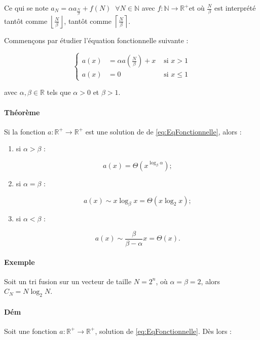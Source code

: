 \documentclass{article}
\newcommand{\floor}[1]{{\left\lfloor#1\right\rfloor}}
\newcommand{\ceil}[1]{{\left\lceil#1\right\rceil}}
\begin{document}
			Ce qui se note $a_N = \alpha a_{\frac N\beta} + f(N)\;\;\forall N \in \mathbb N$ avec $f : \mathbb N \to \mathbb R^+$et où $\frac N\beta$ est interprété
			tantôt comme $\floor{\frac N\beta}$, tantôt comme $\ceil {\frac N\beta}$.

			Commençons par étudier l'équation fonctionnelle suivante :

			\begin{equation}\label{eq:EqFonctionnelle}
				\left\{
					\begin{aligned}
						a(x) &= \alpha a\left(\frac N\beta\right) + x &\text{ si } x > 1\\
						a(x) &= 0 &\text{ si } x \leq 1
					\end{aligned}
				\right.
			\end{equation}

			avec $\alpha, \beta \in \mathbb R$ tels que $\alpha > 0$ et $\beta > 1$.

			\paragraph{Théorème} Si la fonction $a : \mathbb R^+ \to \mathbb R^+$ est une solution de de \eqref{eq:EqFonctionnelle}, alors :

			\begin{enumerate}
				\item si $\alpha > \beta$ :
					  
					  \[a(x) = \Theta\left(x^{\log_\beta\alpha}\right) ;\]
				
				\item si $\alpha = \beta$ :

					  \[a(x) \sim x\log_\beta x = \Theta(x\log_2 x) ;\]

				\item si $\alpha < \beta$ :

					  \[a(x) \sim \frac \beta{\beta-\alpha}x = \Theta(x).\]
			\end{enumerate}

			\paragraph{Exemple} Soit un tri fusion sur un vecteur de taille $N = 2^n$, où $\alpha = \beta = 2$, alors $C_N = N\log_2 N$.

			\paragraph{Dém} Soit une fonction $a : \mathbb R^+ \to \mathbb R^+$, solution de \eqref{eq:EqFonctionnelle}. Dès lors :
\end{document}
